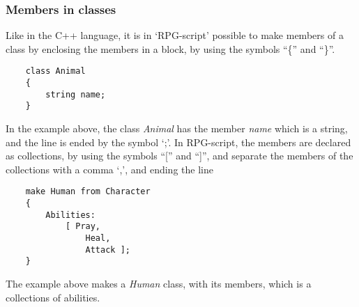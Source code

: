 \subsubsection*{Members in classes}
Like in the C++ language, it is in `RPG-script' possible to make members of a class by enclosing the members in a block, by using the symbols ``\{'' and ``\}''.
\begin{lstlisting}
	class Animal
	{
		string name;
	}
\end{lstlisting}
In the example above, the class \emph{Animal} has the member \emph{name} which is a string, and the line is ended by the symbol `;'.
In RPG-script, the members are declared as collections, by using the symbols ``['' and ``]'', and separate the members of the collections with a comma `,', and ending the line 
\begin{lstlisting}
	make Human from Character
	{	
		Abilities:
			[ Pray, 
				Heal,
				Attack ];
	}
\end{lstlisting}
The example above makes a \emph{Human} class, with its members, which is a collections of abilities.
